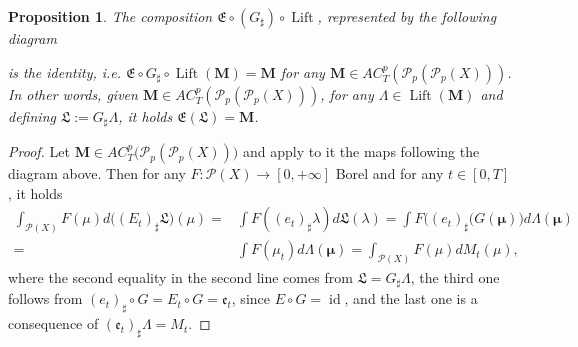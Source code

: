 \documentclass[10pt,leqno]{amsart}
\numberwithin{equation}{section}
\newtheorem{prop}[teorema]{Proposition}
\newcommand{\PP}{\mathcal{P}}
\begin{document}
\begin{prop}\label{3.8}
    The composition $\mathfrak{E}\circ (G_\sharp ) \circ \operatorname{Lift}$, represented by the following diagram
    \begin{center}
    \color{black}
    \normalcolor
    \end{center}
    is the identity, i.e. $\mathfrak{E}\circ G_\sharp  \circ \operatorname{Lift}   (\boldsymbol{M}) = \boldsymbol{M}$ for any $\boldsymbol{M}\in AC_T^p(\PP_p(\PP_p(X)))$. In other words, given $\boldsymbol{M}\in AC_T^p(\PP_p(\PP_p(X)))$, for any $\Lambda\in\operatorname{Lift}(\boldsymbol{M})$ and defining $\mathfrak{L}:= G_\sharp \Lambda$, it holds $\mathfrak{E}(\mathfrak{L}) = \boldsymbol{M}$.
\end{prop}

\begin{proof}
    Let $\boldsymbol{M} \in AC^p_T\big(\PP_p(\PP_p(X))\big)$ and apply to it the maps following the diagram above. Then for any $F:\PP(X) \to [0,+\infty]$ Borel and for any $t\in[0,T]$, it holds
    \begin{align*}
         \int_{\PP(X)} F(\mu) d\big((E_t)_\sharp \mathfrak{L}\big)(\mu) = & \int F((e_t)_{\sharp }\lambda) d\mathfrak{L}(\lambda) 
         =  \int F \big( (e_t)_\sharp (G(\boldsymbol{\mu}) \big) d\Lambda(\boldsymbol{\mu})
         \\
         = & \int F(\mu_t) d\Lambda(\boldsymbol{\mu}) 
         =  \int_{\PP(X)} F(\mu) dM_t(\mu),
    \end{align*}
    where the second equality in the second line comes from $\mathfrak{L} = G_\sharp \Lambda$, the third one follows from $(e_t)_\sharp \circ G = E_t\circ G = \mathfrak{e}_t$, since $E\circ G = \operatorname{id}$, and the last one is a consequence of $(\mathfrak{e}_t)_\sharp \Lambda = M_t$.
\end{proof}
\end{document}
